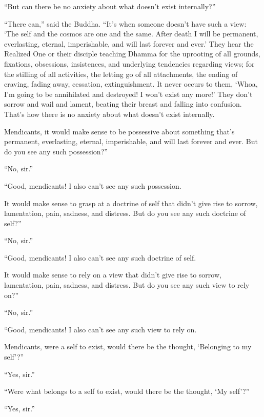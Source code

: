\documentclass[12pt,openany]{book}%
\begin{document}
“But can there be no anxiety about what doesn’t exist internally?” 

“There can,” said the Buddha. “It’s when someone doesn’t have such a view: ‘The self and the cosmos are one and the same. After death I will be permanent, everlasting, eternal, imperishable, and will last forever and ever.’ They hear the Realized One or their disciple teaching Dhamma for the uprooting of all grounds, fixations, obsessions, insistences, and underlying tendencies regarding views; for the stilling of all activities, the letting go of all attachments, the ending of craving, fading away, cessation, extinguishment. It never occurs to them, ‘Whoa, I’m going to be annihilated and destroyed! I won’t exist any more!’ They don’t sorrow and wail and lament, beating their breast and falling into confusion. That’s how there is no anxiety about what doesn’t exist internally. 

Mendicants, it would make sense to be possessive about something that’s permanent, everlasting, eternal, imperishable, and will last forever and ever. But do you see any such possession?” 

“No, sir.” 

“Good, mendicants! I also can’t see any such possession. 

It would make sense to grasp at a doctrine of self that didn’t give rise to sorrow, lamentation, pain, sadness, and distress. But do you see any such doctrine of self?” 

“No, sir.” 

“Good, mendicants! I also can’t see any such doctrine of self. 

It would make sense to rely on a view that didn’t give rise to sorrow, lamentation, pain, sadness, and distress. But do you see any such view to rely on?” 

“No, sir.” 

“Good, mendicants! I also can’t see any such view to rely on. 

Mendicants, were a self to exist, would there be the thought, ‘Belonging to my self’?” 

“Yes, sir.” 

“Were what belongs to a self to exist, would there be the thought, ‘My self’?” 

“Yes, sir.” 
\end{document}
